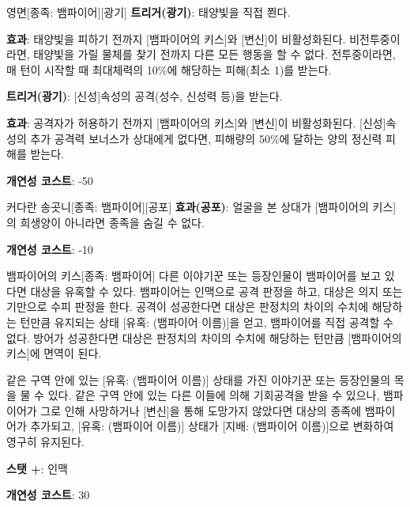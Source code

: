 \documentclass{report}
\begin{document}
	\begin{story}{영면}{[종족: 뱀파이어][광기]}
		\textbf{트리거(광기)}: 태양빛을 직접 쬔다.
		
		\textbf{효과}: 태양빛을 피하기 전까지 [뱀파이어의 키스]와 [변신]이 비활성화된다. 비전투중이라면, 태양빛을 가릴 물체를 찾기 전까지 다른 모든 행동을 할 수 없다. 전투중이라면, 매 턴이 시작할 때 최대체력의 10\%에 해당하는 피해(최소 1)를 받는다.
		
		\smallskip
		
		\textbf{트리거(광기)}: [신성]속성의 공격(성수, 신성력 등)을 받는다.
		
		\textbf{효과}: 공격자가 허용하기 전까지 [뱀파이어의 키스]와 [변신]이 비활성화된다. [신성]속성의 추가 공격력 보너스가 상대에게 없다면, 피해량의 50\%에 달하는 양의 정신력 피해를 받는다.
		
		\smallskip
		
		\textbf{개연성 코스트}: -50
	\end{story}
	
	\begin{story}{커다란 송곳니}{[종족: 뱀파이어][공포]}
		\textbf{효과(공포)}: 얼굴을 본 상대가 [뱀파이어의 키스]의 희생양이 아니라면 종족을 숨길 수 없다.
		
		\smallskip
		
		\textbf{개연성 코스트}: -10
	\end{story}
	
	\begin{story}{뱀파이어의 키스}{[종족: 뱀파이어]}
		다른 이야기꾼 또는 등장인물이 뱀파이어를 보고 있다면 대상을 유혹할 수 있다. 뱀파이어는 인맥으로 공격 판정을 하고, 대상은 의지 또는 기만으로 수피 판정을 한다. 공격이 성공한다면 대상은 판정치의 차이의 수치에 해당하는 턴만큼 유지되는 상태 [유혹: (뱀파이어 이름)]을 얻고, 뱀파이어를 직접 공격할 수 없다. 방어가 성공한다면 대상은 판정치의 차이의 수치에 해당하는 턴만큼 [뱀파이어의 키스]에 면역이 된다.
		
		\smallskip
		
		같은 구역 안에 있는 [유혹: (뱀파이어 이름)] 상태를 가진 이야기꾼 또는 등장인물의 목을 물 수 있다. 같은 구역 안에 있는 다른 이들에 의해 기회공격을 받을 수 있으나, 뱀파이어가 그로 인해 사망하거나 [변신]을 통해 도망가지 않았다면 대상의 종족에 뱀파이어가 추가되고, [유혹: (뱀파이어 이름)] 상태가 [지배: (뱀파이어 이름)]으로 변화하여 영구히 유지된다.
		
		\smallskip
		
		\textbf{스탯 +}: 인맥
		
		\smallskip
		
		\textbf{개연성 코스트}: 30
	\end{story}
	
\end{document}

